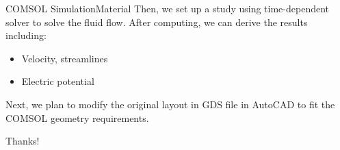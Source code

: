 \documentclass[11pt]{beamer}
\begin{document}
\begin{frame}{COMSOL Simulation}{Material}
    Then, we set up a study using time-dependent solver to solve the fluid flow. After computing, we can derive the results including:
    \begin{itemize}
        \item Velocity, streamlines
        \item Electric potential
    \end{itemize}
    Next, we plan to modify the original layout in GDS file in AutoCAD to fit the COMSOL geometry requirements.
\end{frame}
\begin{frame}
    \begin{center}
        Thanks!
    \end{center}
\end{frame}
\end{document}
